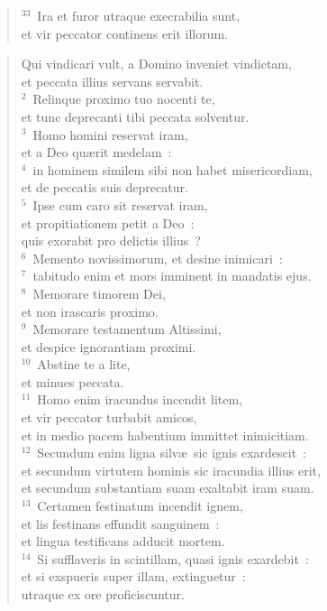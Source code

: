 \begin{flushleft}\begin{verse}${}^{33}$~Ira et furor utraque execrabilia sunt,\\ et vir peccator continens erit illorum.\end{verse}\end{flushleft}


\begin{flushleft}\begin{verse}\vspace{-19pt}\hspace{6pt}Qui vindicari vult, a Domino inveniet vindictam,\\\hspace{6pt} et peccata illius servans servabit.\\
${}^{2}$~Relinque proximo tuo nocenti te,\\ et tunc deprecanti tibi peccata solventur.\\
${}^{3}$~Homo homini reservat iram,\\ et a Deo qu\ae rit medelam~:\\
${}^{4}$~in hominem similem sibi non habet misericordiam,\\ et de peccatis suis deprecatur.\\
${}^{5}$~Ipse cum caro sit reservat iram,\\ et propitiationem petit a Deo~:\\ quis exorabit pro delictis illius~?\\
${}^{6}$~Memento novissimorum, et desine inimicari~:\\
${}^{7}$~tabitudo enim et mors imminent in mandatis ejus.\\
${}^{8}$~Memorare timorem Dei,\\ et non irascaris proximo.\\
${}^{9}$~Memorare testamentum Altissimi,\\ et despice ignorantiam proximi.\\
${}^{10}$~Abstine te a lite,\\ et minues peccata.\\
${}^{11}$~Homo enim iracundus incendit litem,\\ et vir peccator turbabit amicos,\\ et in medio pacem habentium immittet inimicitiam.\\
${}^{12}$~Secundum enim ligna silv\ae\ sic ignis exardescit~:\\ et secundum virtutem hominis sic iracundia illius erit,\\ et secundum substantiam suam exaltabit iram suam.\\
${}^{13}$~Certamen festinatum incendit ignem,\\ et lis festinans effundit sanguinem~:\\ et lingua testificans adducit mortem.\\
${}^{14}$~Si sufflaveris in scintillam, quasi ignis exardebit~:\\ et si exspueris super illam, extinguetur~:\\ utraque ex ore proficiscuntur.\end{verse}\end{flushleft}


